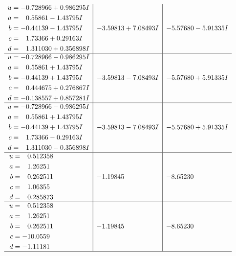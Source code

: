 \documentclass[1p]{elsarticle_modified}
\theoremstyle{definition}
\begin{document}
$$\begin{array}{c|c|c}
\begin{aligned}
u &= -0.728966 + 0.986295 I \\
a &= \phantom{-}0.55861 - 1.43795 I \\
b &= -0.44139 - 1.43795 I \\
c &= \phantom{-}1.73366 + 0.29163 I \\
d &= \phantom{-}1.311030 + 0.356898 I\end{aligned}
 & -3.59813 + 7.08493 I & -5.57680 - 5.91335 I \\ \hline\begin{aligned}
u &= -0.728966 - 0.986295 I \\
a &= \phantom{-}0.55861 + 1.43795 I \\
b &= -0.44139 + 1.43795 I \\
c &= \phantom{-}0.444675 + 0.276867 I \\
d &= -0.138557 + 0.857281 I\end{aligned}
 & -3.59813 - 7.08493 I & -5.57680 + 5.91335 I \\ \hline\begin{aligned}
u &= -0.728966 - 0.986295 I \\
a &= \phantom{-}0.55861 + 1.43795 I \\
b &= -0.44139 + 1.43795 I \\
c &= \phantom{-}1.73366 - 0.29163 I \\
d &= \phantom{-}1.311030 - 0.356898 I\end{aligned}
 & -3.59813 - 7.08493 I & -5.57680 + 5.91335 I \\ \hline\begin{aligned}
u &= \phantom{-}0.512358\phantom{ +0.000000I} \\
a &= \phantom{-}1.26251\phantom{ +0.000000I} \\
b &= \phantom{-}0.262511\phantom{ +0.000000I} \\
c &= \phantom{-}1.06355\phantom{ +0.000000I} \\
d &= \phantom{-}0.285873\phantom{ +0.000000I}\end{aligned}
 & -1.19845\phantom{ +0.000000I} & -8.65230\phantom{ +0.000000I} \\ \hline\begin{aligned}
u &= \phantom{-}0.512358\phantom{ +0.000000I} \\
a &= \phantom{-}1.26251\phantom{ +0.000000I} \\
b &= \phantom{-}0.262511\phantom{ +0.000000I} \\
c &= -10.0559\phantom{ +0.000000I} \\
d &= -1.11181\phantom{ +0.000000I}\end{aligned}
 & -1.19845\phantom{ +0.000000I} & -8.65230\phantom{ +0.000000I}\\
 \hline 
 \end{array}$$\newpage\newpage\renewcommand{\arraystretch}{1}
\end{document}

